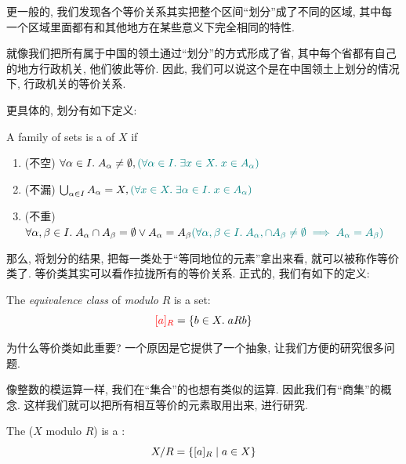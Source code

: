 更一般的, 我们发现各个等价关系其实把整个区间``划分''成了不同的区域, 其中每一个区域里面都有和其他地方在某些意义下完全相同的特性. 

就像我们把所有属于中国的领土通过``划分''的方式形成了省, 其中每个省都有自己的地方行政机关, 他们彼此等价. 因此, 我们可以说这个是在中国领土上划分的情况下, 行政机关的等价关系. 

更具体的, 划分有如下定义: 

\begin{definition}[划分 (Partition)]
  A family of sets 
  is a  of $X$ if

  \begin{enumerate}
    \item (不空)
      $\forall \alpha \in I.\; A_{\alpha} \neq \emptyset,\textcolor{teal}{(\forall \alpha \in I.\; \exists x \in X.\; x \in A_{\alpha})}$
    \item (不漏)
      $\bigcup_{\alpha \in I} A_{\alpha} = X, \textcolor{teal}{(\forall x \in X.\; \exists \alpha \in I.\; x \in A_{\alpha})}$
    \item (不重)
      $
        \forall \alpha, \beta \in I.\; A_{\alpha} \cap A_{\beta} = \emptyset \lor A_{\alpha} = A_{\beta}
        \textcolor{teal}{(\forall \alpha, \beta \in I.\; A_{\alpha}, \cap A_{\beta} \neq \emptyset \implies A_{\alpha} = A_{\beta})}
      $
  \end{enumerate}
\end{definition}

那么, 将划分的结果, 把每一类处于``等同地位的元素''拿出来看, 就可以被称作等价类了. 等价类其实可以看作拉拢所有的等价关系. 正式的, 我们有如下的定义: 

\begin{definition}
  The {\it equivalence class} of  {\it modulo} $R$ is a set:
  \[
    \textcolor{red}{[a]_{R}} = \{b \in X.\; a R b\}
  \]
\end{definition}

为什么等价类如此重要? 一个原因是它提供了一个抽象, 让我们方便的研究很多问题. 

像整数的模运算一样, 我们在``集合''的也想有类似的运算. 因此我们有``商集''的概念. 这样我们就可以把所有相互等价的元素取用出来, 进行研究. 

\begin{definition}
  The   ($X$ modulo $R$)
  is a :
  \[
    X/R = \{[a]_{R} \mid a \in X\}
  \]
\end{definition}

